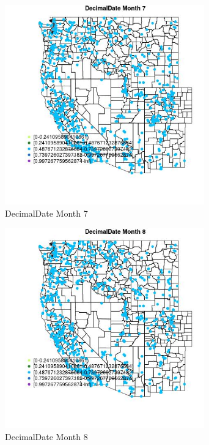 \begin{figure} 
\centering  
\includegraphics[width=0.77\textwidth]{Code_Outputs/Report_ML_input_PM25_Step4_part_e_de_duplicated_aveswNAs_MapObsMo7DecimalDate.jpg} 
\caption{\label{fig:Report_ML_input_PM25_Step4_part_e_de_duplicated_aveswNAsMapObsMo7DecimalDate}DecimalDate Month 7} 
\end{figure} 
 

\begin{figure} 
\centering  
\includegraphics[width=0.77\textwidth]{Code_Outputs/Report_ML_input_PM25_Step4_part_e_de_duplicated_aveswNAs_MapObsMo8DecimalDate.jpg} 
\caption{\label{fig:Report_ML_input_PM25_Step4_part_e_de_duplicated_aveswNAsMapObsMo8DecimalDate}DecimalDate Month 8} 
\end{figure} 
 

